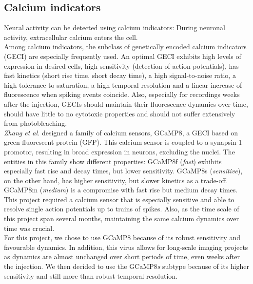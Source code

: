 \subsection{Calcium indicators}
Neural activity can be detected using calcium indicators: During neuronal activity, extracellular calcium enters the cell.\\
Among calcium indicators, the subclass of genetically encoded calcium indicators (GECI) are especially frequently used. An optimal GECI exhibits high levels of expression in desired cells, high sensitivity (detection of action potentials), has fast kinetics (short rise time, short decay time), a high signal-to-noise ratio, a high tolerance to saturation, a high temporal resolution and a linear increase of fluorescence when spiking events coincide. Also, especially for recordings weeks after the injection, GECIs should maintain their fluorescence dynamics over time, should have little to no cytotoxic properties and should not suffer extensively from photobleaching. \cite{Zhang2023} \\
\textit{Zhang et al.} designed a family of calcium sensors, GCaMP8, a GECI based on green fluorescent protein (GFP). This calcium sensor is coupled to a synapsin-1 promotor, resulting in broad expression in neurons, excluding the nuclei. The entities in this family show different properties: GCaMP8f (\textit{fast}) exhibits especially fast rise and decay times, but lower sensitivity. GCaMP8s (\textit{sensitive}), on the other hand, has higher sensitivity, but slower kinetics as a trade-off. GCaMP8m (\textit{medium}) is a compromise with fast rise but medium decay times. \cite{Zhang2023} \\
This project required a calcium sensor that is especially sensitive and able to resolve single action potentials up to trains of spikes. Also, as the time scale of this project span several months, maintaining the same calcium dynamics over time was crucial. \\
For this project, we chose to use GCaMP8 because of its robust sensitivity and favourable dynamics. In addition, this virus allows for long-scale imaging projects as dynamics are almost unchanged over short periods of time, even weeks after the injection.  \cite{Zhang2023} We then decided to use the GCaMP8\textit{s} subtype because of its higher sensitivity and still more than robust temporal resolution.
